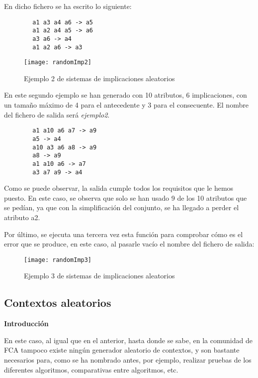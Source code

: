     En dicho fichero se ha escrito lo siguiente:

    \begin{verbatim}
        a1 a3 a4 a6 -> a5 
        a1 a2 a4 a5 -> a6 
        a3 a6 -> a4 
        a1 a2 a6 -> a3    
    \end{verbatim}


    \begin{figure}[H]
        \centering
        \texttt{[image: randomImp2]}
        \caption{Ejemplo 2 de sistemas de implicaciones aleatorios}
        \label{fig:randomImp2}
    \end{figure}

    En este segundo ejemplo se han generado con 10 atributos, 6 implicaciones, con un tama\~no m\'aximo de 4 para el antecedente y 3 para el 
    consecuente. El nombre del fichero de salida ser\'a \textit{ejemplo2}.

    \begin{verbatim}
        a1 a10 a6 a7 -> a9 
        a5 -> a4 
        a10 a3 a6 a8 -> a9 
        a8 -> a9 
        a1 a10 a6 -> a7 
        a3 a7 a9 -> a4 
    \end{verbatim}
    Como se puede observar, la salida cumple todos los requisitos que le hemos puesto. En este caso, se observa que solo se han usado 9 de 
    los 10 atributos que se ped\'ian, ya que con la simplificaci\'on del conjunto, se ha llegado a perder el atributo a2.
    \\
    
    \bigskip

    Por \'ultimo, se ejecuta una tercera vez esta funci\'on para comprobar c\'omo es el error que se produce, en este caso, al pasarle vac\'io 
    el nombre del fichero de salida:

    \begin{figure}[H]
        \centering
        \texttt{[image: randomImp3]}
        \caption{Ejemplo 3 de sistemas de implicaciones aleatorios}
        \label{fig:randomImp3}
    \end{figure}

    \clearpage


\subsection{Contextos aleatorios}

    \textbf{Introducci\'on}

    En este caso, al igual que en el anterior, hasta donde se sabe, en la comunidad de FCA tampoco existe ning\'un generador aleatorio de 
    contextos, y son bastante necesarios para, como se ha nombrado antes, por ejemplo, realizar pruebas de los diferentes algoritmos, comparativas 
    entre algoritmos, etc.

